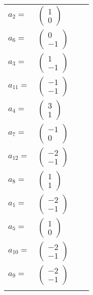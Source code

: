 \documentclass[1p]{elsarticle_modified}
\theoremstyle{definition}
\begin{document}
\begin{tabular}{m{7pt} m{180pt} m{7pt} m{180pt} }
\flushright $a_{2}=$&$\begin{pmatrix}1\\0\end{pmatrix}$ \\
\flushright $a_{6}=$&$\begin{pmatrix}0\\-1\end{pmatrix}$ \\
\flushright $a_{3}=$&$\begin{pmatrix}1\\-1\end{pmatrix}$ \\
\flushright $a_{11}=$&$\begin{pmatrix}-1\\-1\end{pmatrix}$ \\
\flushright $a_{4}=$&$\begin{pmatrix}3\\1\end{pmatrix}$ \\
\flushright $a_{7}=$&$\begin{pmatrix}-1\\0\end{pmatrix}$ \\
\flushright $a_{12}=$&$\begin{pmatrix}-2\\-1\end{pmatrix}$ \\
\flushright $a_{8}=$&$\begin{pmatrix}1\\1\end{pmatrix}$ \\
\flushright $a_{1}=$&$\begin{pmatrix}-2\\-1\end{pmatrix}$ \\
\flushright $a_{5}=$&$\begin{pmatrix}1\\0\end{pmatrix}$ \\
\flushright $a_{10}=$&$\begin{pmatrix}-2\\-1\end{pmatrix}$ \\
\flushright $a_{9}=$&$\begin{pmatrix}-2\\-1\end{pmatrix}$\\&\end{tabular}
\end{document}
